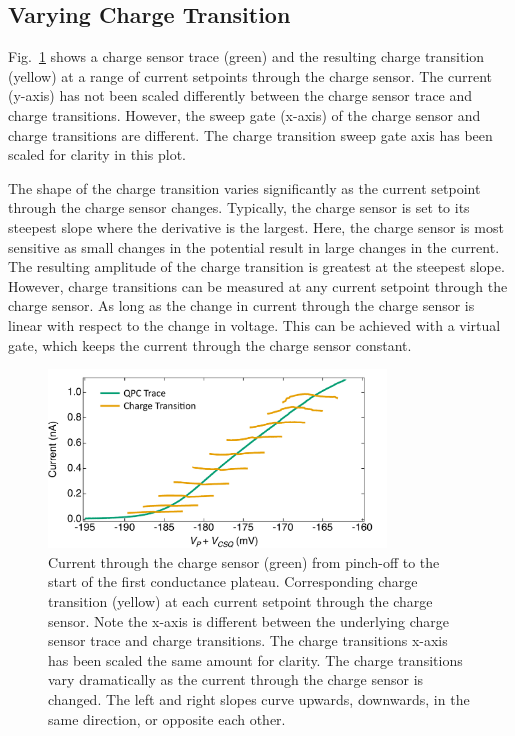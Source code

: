 \subsection{Varying Charge Transition}

Fig.~\ref{fig:ch3/cond_occ_ct_set-points} shows a charge sensor trace (green) and the resulting charge transition (yellow) at a range of current setpoints through the charge sensor. The current (y-axis) has not been scaled differently between the charge sensor trace and charge transitions. However, the sweep gate (x-axis) of the charge sensor and charge transitions are different. The charge transition sweep gate axis has been scaled for clarity in this plot. 



The shape of the charge transition varies significantly as the current setpoint through the charge sensor changes. Typically, the charge sensor is set to its steepest slope where the derivative is the largest. Here, the charge sensor is most sensitive as small changes in the potential result in large changes in the current. The resulting amplitude of the charge transition is greatest at the steepest slope. However, charge transitions can be measured at any current setpoint through the charge sensor. As long as the change in current through the charge sensor is linear with respect to the change in voltage. This can be achieved with a virtual gate, which keeps the current through the charge sensor constant. 

\begin{figure}[!bht]
 \begin{center}
 \includegraphics[width=0.8\textwidth]{figures/ch3/figure16.pdf}
 \caption[Varying Charge Sensor Current Setpoint]{\label{fig:ch3/cond_occ_ct_set-points} 
 Current through the charge sensor (green) from pinch-off to the start of the first conductance plateau. Corresponding charge transition (yellow) at each current setpoint through the charge sensor. Note the x-axis is different between the underlying charge sensor trace and charge transitions. The charge transitions x-axis has been scaled the same amount for clarity. The charge transitions vary dramatically as the current through the charge sensor is changed. The left and right slopes curve upwards, downwards, in the same direction, or opposite each other.}
 \end{center}
\end{figure}
\FloatBarrier

